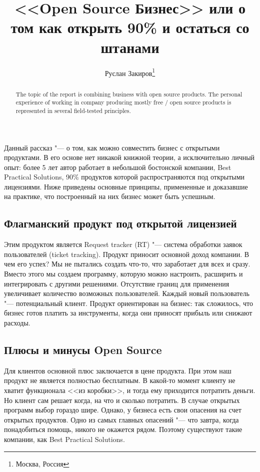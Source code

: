 

\title{<<Open Source Бизнес>> или о том как открыть 90\% и остаться со штанами}
\author{Руслан Закиров\footnote{Москва, Россия}}
\date{}
\maketitle
\begin{abstract}
The topic of the report is combining business with open source products. 
The personal experience of working in company pro\-ducing mostly free / open source 
products is represented in se\-ve\-ral field-tested principles.
\end{abstract}

Данный рассказ "--- о том, как можно совместить бизнес с открытыми продуктами. 
В его основе нет никакой книжной теории, а исключительно личный опыт:
более 5 лет автор работает в небольшой бостонской компании, Best Practical Solutions, 
90\% продуктов которой распространяются под открытыми лицензиями.
Ниже приведены основные принципы, примененные и доказавшие на практике, 
что построенный на них бизнес может быть успешным.

\subsection*{Флагманский продукт под открытой лицензией}

Этим продуктом является Request tracker (RT) "--- система обработки заявок пользователей 
(ticket tracking). Продукт приносит основной доход компании. В чем его успех? Мы не пытались
создать что-то, что заработает для всех и сразу. 
Вместо этого мы создаем программу, которую можно настроить,
расширить и интегрировать с другими решениями. Отсутствие границ для
применения увеличивает количество возможных пользователей. Каждый
новый пользователь "--- потенциальный клиент. Продукт ориентирован на
бизнес: так сложилось, что бизнес готов платить за инструменты,
когда они приносят прибыль или снижают расходы.

\subsection*{Плюсы и минусы Open Source}

Для клиентов основной плюс заключается в цене продукта. При этом наш
продукт не является полностью бесплатным. В какой-то момент клиенту не хватит функционала
<<из коробки>>, и тогда ему приходится потратить деньги. Но клиент
сам решает когда, на что и сколько потратить. 
В случае открытых программ выбор гораздо шире. Однако, у бизнеса есть свои опасения на счет
открытых продуктов. Одно из самых главных опасений "--- что завтра, когда понадобиться
помощь, никого не окажется рядом. Поэтому существуют такие компании, как Best Practical
Solutions.

